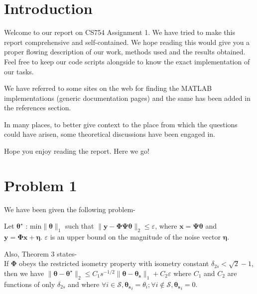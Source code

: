 \documentclass[a4paper,11pt]{article}
\numberwithin{definition}{section}
\numberwithin{mytheorem}{subsection}
\begin{document}




\date{Spring 2022}
\maketitle

\justifying
\tableofcontents

\newpage
\justifying
\section*{Introduction}

Welcome  to our report on CS754 Assignment 1. We have tried to make this report comprehensive and self-contained. We hope reading this would give you a proper flowing description of our work, methods used and the results obtained. Feel free to keep our code scripts alongside to know the exact implementation of our tasks. 

We have referred to some sites on the web for finding the MATLAB implementations (generic documentation pages) and the same has been added in the references section. 

In many places, to better give context to the place from which the questions could have arisen, some theoretical discussions have been engaged in.

Hope you enjoy reading the report. Here we go!


\section{Problem 1}
We have been given the following problem-

Let $\boldsymbol{\theta^{\star}}$ : $\textrm{min} \|\boldsymbol{\theta}\|_1$ such that $\|\boldsymbol{y}-\boldsymbol{\Phi \Psi \theta}\|_2 \leq \varepsilon$, where $\boldsymbol{x} = \boldsymbol{\Psi \theta}$ and $\boldsymbol{y} = \boldsymbol{\Phi x} + \boldsymbol{\eta}$. $\varepsilon$ is an upper bound on the magnitude of the noise vector $\boldsymbol{\eta}$.

Also, Theorem 3 states-\\If $\boldsymbol{\Phi}$ obeys the restricted isometry property with isometry constant $\delta_{2s} < \sqrt{2}-1$, then we have $\|\boldsymbol{\theta} - \boldsymbol{\theta^{\star}}\|_2 \leq C_1 s^{-1/2}\|\boldsymbol{\theta}-\boldsymbol{\theta_s}\|_1 + C_2 \varepsilon$ where $C_1$ and $C_2$ are functions of only $\delta_{2s}$ and where $\forall i \in \mathcal{S}, \boldsymbol{\theta_s}_i = \theta_i; \forall i \notin \mathcal{S}, \boldsymbol{\theta_s}_i = 0$.
\end{document}
